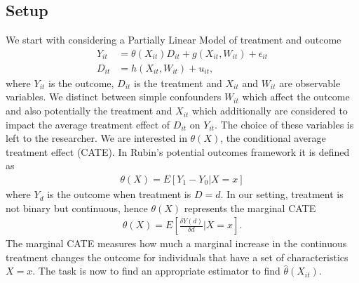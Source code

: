 \subsection{Setup} \label{sec:dml-idea}
We start with considering a Partially Linear Model of treatment and outcome 
\begin{align}
    Y_{it}&=\theta(X_{it})D_{it}+g(X_{it}, W_{it})+\epsilon_{it} \label{eq:plm1}\\
    D_{it}&=h(X_{it}, W_{it})+u_{it}, \label{eq:plm2}
\end{align}
where $Y_{it}$ is the outcome, $D_{it}$ is the treatment and $X_{it}$ and $W_{it}$ are observable variables. We distinct between simple confounders $W_{it}$ which affect the outcome and also potentially the treatment and $X_{it}$ which additionally are considered to impact the average treatment effect of $D_{it}$ on $Y_{it}$. The choice of these variables is left to the researcher. We are interested in $\theta(X)$, the conditional average treatment effect (CATE). In Rubin's potential outcomes framework it is defined as 
\begin{align*}
    \theta(X)=E[Y_1 - Y_0 | X=x]
\end{align*}
where $Y_d$ is the outcome when treatment is $D=d$. In our setting, treatment is not binary but continuous, hence $\theta(X)$ represents the marginal CATE
\begin{align*}
    \theta(X)=E\left[\frac{\delta Y(d)}{\delta d} \bigg| X=x\right].
\end{align*}
The marginal CATE measures how much a marginal increase in the continuous treatment changes the outcome for individuals that have a set of characteristics $X=x$. The task is now to find an appropriate estimator to find $\hat{\theta}(X_{it})$.

